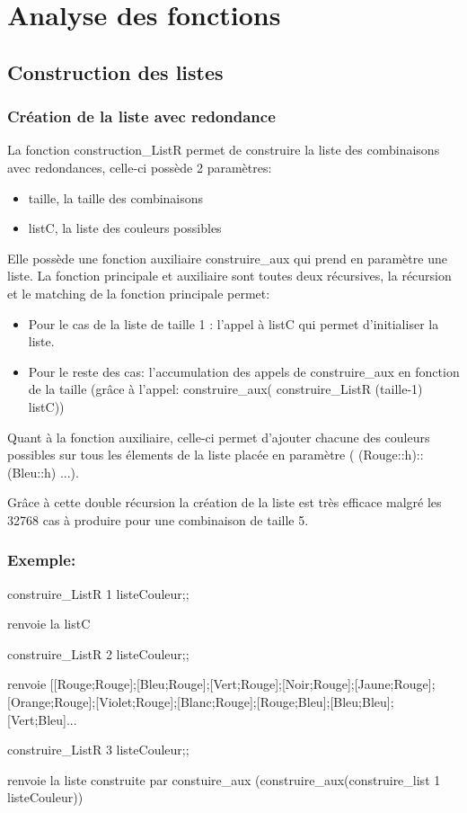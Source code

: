 \documentclass[a4paper,twoside,12pt]{report}
\newcommand{\moncode}[1]{\begin{center}
                        
                        \end{center}}
\begin{document}
\chapter{Analyse des fonctions}
%
\moncode{listCouleur.mli}
%
\section{Construction des listes}
%
\moncode{construc.ml}
\subsection{Création de la liste avec redondance}
\par
La fonction construction\_ListR permet de construire la liste des combinaisons avec redondances, celle-ci possède 2 paramètres:
\begin{itemize}
\item taille, la taille des combinaisons
\item listC, la liste des couleurs possibles
\end{itemize}
\par
Elle possède une fonction auxiliaire construire\_aux qui prend en paramètre une liste.
La fonction principale et auxiliaire sont toutes deux récursives, la récursion et le matching de la fonction principale permet:
\begin{itemize}
\item Pour le cas de la liste de taille 1 : l'appel à listC qui permet d'initialiser la liste.
\item Pour le reste des cas: l'accumulation des appels de construire\_aux en fonction de la taille (grâce à l'appel: construire\_aux( construire\_ListR (taille-1) listC))
\end{itemize}
\par Quant à la fonction auxiliaire, celle-ci permet d'ajouter chacune des couleurs possibles sur tous les élements de la liste placée en paramètre ( (Rouge::h)::(Bleu::h) ...). 
\par Grâce à cette double récursion la création de la liste est très efficace malgré les 32768 cas à produire pour une combinaison de taille 5.
\subsection{Exemple:}
%
\par
construire\_ListR 1 listeCouleur;;
\par renvoie la listC
\par construire\_ListR 2 listeCouleur;;
\par renvoie [[Rouge;Rouge];[Bleu;Rouge];[Vert;Rouge];[Noir;Rouge];[Jaune;Rouge];[Orange;Rouge];[Violet;Rouge];[Blanc;Rouge];[Rouge;Bleu];[Bleu;Bleu];[Vert;Bleu]...
\par construire\_ListR 3 listeCouleur;;
\par renvoie la liste construite par constuire\_aux (construire\_aux(construire\_list 1 listeCouleur))
\end{document}
